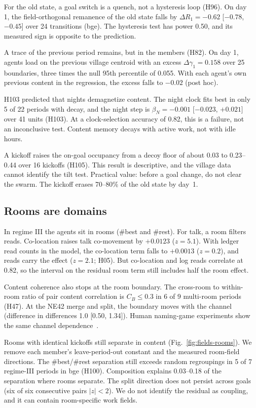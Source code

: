 For the old state, a goal switch is a quench, not a hysteresis loop (H96). On day 1, the field-orthogonal remanence of the old state falls by $\Delta R_1=-0.62$ [$-0.78$, $-0.45$] over 24 transitions (bge). The hysteresis test has power 0.50, and its measured sign is opposite to the prediction.

A trace of the previous period remains, but in the members (H82). On day 1, agents load on the previous village centroid with an excess $\Delta\gamma_1=0.158$ over 25 boundaries, three times the null 95th percentile of 0.055. With each agent's own previous content in the regression, the excess falls to $-0.02$ (post hoc).

H103 predicted that nights demagnetize content. The night clock fits best in only 5 of 22 periods with decay, and the night step is $\beta_N=-0.001$ [$-0.023$, $+0.021$] over 41 units (H103). At a clock-selection accuracy of 0.82, this is a failure, not an inconclusive test. Content memory decays with active work, not with idle hours.

A kickoff raises the on-goal occupancy from a decoy floor of about 0.03 to 0.23--0.44 over 16 kickoffs (H105). This result is descriptive, and the village data cannot identify the tilt test. Practical value: before a goal change, do not clear the swarm. The kickoff erases 70--80\% of the old state by day~1.

\subsection{Rooms are domains}

In regime III the agents sit in rooms (\#best and \#rest). For talk, a room filters reads. Co-location raises talk co-movement by $+0.0123$ ($z=5.1$). With ledger read counts in the model, the co-location term falls to $+0.0013$ ($z=0.2$), and reads carry the effect ($z=2.1$; H05). But co-location and log reads correlate at 0.82, so the interval on the residual room term still includes half the room effect.

Content coherence also stops at the room boundary. The cross-room to within-room ratio of pair content correlation is $C_B\le0.3$ in 6 of 9 multi-room periods (H47). At the NE42 merge and split, the boundary moves with the channel (difference in differences 1.0 [0.50, 1.34]). Human naming-game experiments show the same channel dependence~\cite{centola2015}.

Rooms with identical kickoffs still separate in content (Fig.~\ref{fig:fields-rooms}). We remove each member's leave-period-out constant and the measured room-field directions. The \#best/\#rest separation still exceeds random regroupings in 5 of 7 regime-III periods in bge (H100). Composition explains 0.03--0.18 of the separation where rooms separate. The split direction does not persist across goals (six of six consecutive pairs $|z|<2$). We do not identify the residual as coupling, and it can contain room-specific work fields.

